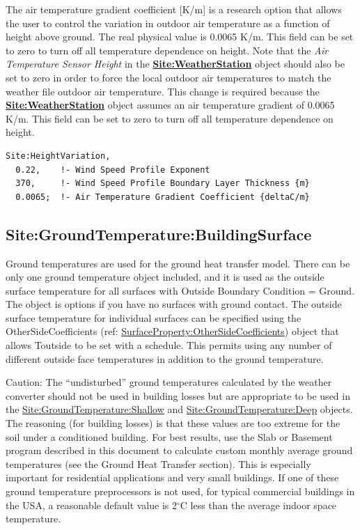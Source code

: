 The air temperature gradient coefficient {[}K/m{]} is a research option that allows the user to control the variation in outdoor air temperature as a function of height above ground. The real physical value is 0.0065 K/m. This field can be set to zero to turn off all temperature dependence on height. Note that the \emph{Air Temperature Sensor Height} in the \textbf{\hyperref[siteweatherstation]{Site:WeatherStation}} object should also be set to zero in order to force the local outdoor air temperatures to match the weather file outdoor air temperature. This change is required because the \textbf{\hyperref[siteweatherstation]{Site:WeatherStation}} object assumes an air temperature gradient of 0.0065 K/m. This field can be set to zero to turn off all temperature dependence on height.

\begin{lstlisting}
Site:HeightVariation,
  0.22,    !- Wind Speed Profile Exponent
  370,     !- Wind Speed Profile Boundary Layer Thickness {m}
  0.0065;  !- Air Temperature Gradient Coefficient {deltaC/m}
\end{lstlisting}

\subsection{Site:GroundTemperature:BuildingSurface}\label{sitegroundtemperaturebuildingsurface}

Ground temperatures are used for the ground heat transfer model. There can be only one ground temperature object included, and it is used as the outside surface temperature for all surfaces with Outside Boundary Condition = Ground. The object is options if you have no surfaces with ground contact. The outside surface temperature for individual surfaces can be specified using the OtherSideCoefficients (ref: \hyperref[surfacepropertyothersidecoefficients]{SurfaceProperty:OtherSideCoefficients}) object that allows Toutside to be set with a schedule. This permits using any number of different outside face temperatures in addition to the ground temperature.

\begin{callout}
Caution: The ``undisturbed'' ground temperatures calculated by the weather converter should not be used in building losses but are appropriate to be used in the \hyperref[sitegroundtemperatureshallow]{Site:GroundTemperature:Shallow} and \hyperref[sitegroundtemperaturedeep]{Site:GroundTemperature:Deep} objects. The reasoning (for building losses) is that these values are too extreme for the soil under a conditioned building. For best results, use the Slab or Basement program described in this document to calculate custom monthly average ground temperatures (see the Ground Heat Transfer section). This is especially important for residential applications and very small buildings. If one of these ground temperature preprocessors is not used, for typical commercial buildings in the USA, a reasonable default value is 2$^\circ$C less than the average indoor space temperature.
\end{callout}

